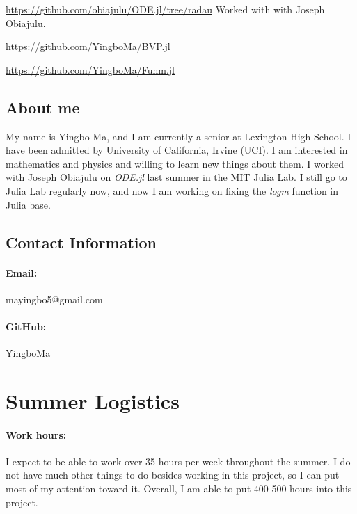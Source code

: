 \documentclass[a4paper,11pt,onecolumn]{article}
\begin{document}
\url{https://github.com/obiajulu/ODE.jl/tree/radau} Worked with with Joseph Obiajulu.

\url{https://github.com/YingboMa/BVP.jl}

\url{https://github.com/YingboMa/Funm.jl}

\subsection{About me} %
\label{ssub:about_me}
My name is Yingbo Ma, and I am currently a senior at Lexington High School. I have been admitted by
University of California, Irvine (UCI). I am interested in mathematics and physics and willing to
learn new things about them. I worked with Joseph Obiajulu on \textit{ODE.jl} last summer in the MIT
Julia Lab. I still go to Julia Lab regularly now, and now I am working on fixing the \textit{logm}
function in Julia base.

\subsection{Contact Information} %
\label{ssub:contact_information}
\paragraph{Email:} mayingbo5@gmail.com

\paragraph{GitHub:} YingboMa


\section{Summer Logistics} %
\label{sec:summer_logistics}

\paragraph{Work hours:} I expect to be able to work over 35 hours per week throughout the summer.
I do not have much other things to do besides working in this project, so I can put most of my
attention toward it. Overall, I am able to put 400-500 hours into this project.
\end{document}

